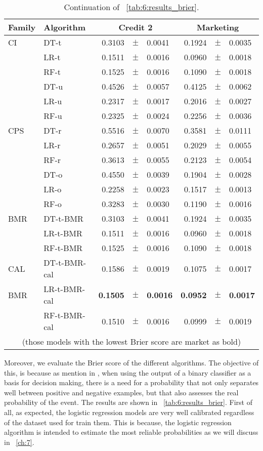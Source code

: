 \begin{table}[t]
    \centering
    \footnotesize
    \begin{tabular}{l l r@{\hskip 0in}c@{\hskip 0in}l r@{\hskip 0in}c@{\hskip 0in}l  } %
    \hline
    \bf{Family} & \bf{Algorithm} &  \multicolumn{3}{c}{\bf{Credit 2}} 
& \multicolumn{3}{c}{\bf{Marketing}} \\ 
    \hline
CI&DT-t & 0.3103 &$\pm$& 0.0041 & 0.1924 &$\pm$& 0.0035\\ 
&LR-t & 0.1511 &$\pm$& 0.0016 & 0.0960 &$\pm$& 0.0018\\ 
&RF-t & 0.1525 &$\pm$& 0.0016 & 0.1090 &$\pm$& 0.0018\\ 
&DT-u & 0.4526 &$\pm$& 0.0057 & 0.4125 &$\pm$& 0.0062\\ 
&LR-u & 0.2317 &$\pm$& 0.0017 & 0.2016 &$\pm$& 0.0027\\ 
&RF-u & 0.2325 &$\pm$& 0.0024 & 0.2256 &$\pm$& 0.0036\\ 
\hline 
CPS&DT-r & 0.5516 &$\pm$& 0.0070 & 0.3581 &$\pm$& 0.0111\\ 
&LR-r & 0.2657 &$\pm$& 0.0051 & 0.2029 &$\pm$& 0.0055\\ 
&RF-r & 0.3613 &$\pm$& 0.0055 & 0.2123 &$\pm$& 0.0054\\ 
&DT-o & 0.4550 &$\pm$& 0.0039 & 0.1904 &$\pm$& 0.0028\\ 
&LR-o & 0.2258 &$\pm$& 0.0023 & 0.1517 &$\pm$& 0.0013\\ 
&RF-o & 0.3283 &$\pm$& 0.0030 & 0.1190 &$\pm$& 0.0016\\ 
\hline 
BMR&DT-t-BMR & 0.3103 &$\pm$& 0.0041 & 0.1924 &$\pm$& 0.0035\\ 
&LR-t-BMR & 0.1511 &$\pm$& 0.0016 & 0.0960 &$\pm$& 0.0018\\ 
&RF-t-BMR & 0.1525 &$\pm$& 0.0016 & 0.1090 &$\pm$& 0.0018\\ 
\hline 
CAL&DT-t-BMR-cal & 0.1586 &$\pm$& 0.0019 & 0.1075 &$\pm$& 0.0017\\ 
BMR&LR-t-BMR-cal & \bf{0.1505} &\bf{$\pm$}& \bf{0.0016} & \bf{0.0952} &\bf{$\pm$}& \bf{0.0017}\\ 
&RF-t-BMR-cal & 0.1510 &$\pm$& 0.0016 & 0.0999 &$\pm$& 0.0019\\ 
\hline 
  \multicolumn{8}{c}{(those models with the lowest Brier score are market as bold)}
  \end{tabular}
    \caption{Continuation of \tablename{~\ref{tab:6:results_brier}}.}
    \label{tab:6:results_savings2}
  \end{table}

  
Moreover, we evaluate the Brier score of the different algorithms. The objective of this, is 
because as mention in  \citep{cohen2004}, when using the output of a binary classifier as a basis 
for decision making, there is a need for a probability that not only separates well between 
positive 
and negative examples, but that also assesses the real probability of the event. The results are 
shown in \tablename{~\ref{tab:6:results_brier}}. First of all, as expected, the logistic regression 
models are very well calibrated regardless of the dataset used for train them. This is because, the 
logistic regression algorithm is intended to estimate the most reliable probabilities as we will 
discuss in \chaptername{~\ref{ch:7}}.

